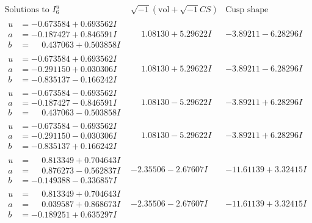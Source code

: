 \documentclass[1p]{elsarticle_modified}
\theoremstyle{definition}
\newcommand{\I}{\sqrt{-1}}
\begin{document}
$$\begin{array}{c|c|c}  
\text{Solutions to }I^u_{6}& \I (\text{vol} + \sqrt{-1}CS) & \text{Cusp shape}\\
 \hline 
\begin{aligned}
u &= -0.673584 + 0.693562 I \\
a &= -0.187427 + 0.846591 I \\
b &= \phantom{-}0.437063 + 0.503858 I\end{aligned}
 & \phantom{-}1.08130 + 5.29622 I & -3.89211 - 6.28296 I \\ \hline\begin{aligned}
u &= -0.673584 + 0.693562 I \\
a &= -0.291150 + 0.030306 I \\
b &= -0.835137 - 0.166242 I\end{aligned}
 & \phantom{-}1.08130 + 5.29622 I & -3.89211 - 6.28296 I \\ \hline\begin{aligned}
u &= -0.673584 - 0.693562 I \\
a &= -0.187427 - 0.846591 I \\
b &= \phantom{-}0.437063 - 0.503858 I\end{aligned}
 & \phantom{-}1.08130 - 5.29622 I & -3.89211 + 6.28296 I \\ \hline\begin{aligned}
u &= -0.673584 - 0.693562 I \\
a &= -0.291150 - 0.030306 I \\
b &= -0.835137 + 0.166242 I\end{aligned}
 & \phantom{-}1.08130 - 5.29622 I & -3.89211 + 6.28296 I \\ \hline\begin{aligned}
u &= \phantom{-}0.813349 + 0.704643 I \\
a &= \phantom{-}0.876273 - 0.562837 I \\
b &= -0.149388 - 0.336857 I\end{aligned}
 & -2.35506 - 2.67607 I & -11.61139 + 3.32415 I \\ \hline\begin{aligned}
u &= \phantom{-}0.813349 + 0.704643 I \\
a &= \phantom{-}0.039587 + 0.868673 I \\
b &= -0.189251 + 0.635297 I\end{aligned}
 & -2.35506 - 2.67607 I & -11.61139 + 3.32415 I \\ \hline\begin{aligned}

\end{aligned}
\end{array}$$
\end{document}
